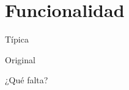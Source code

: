 
\section{Funcionalidad}

	\begin{frame}{Típica}

	\end{frame}

    \begin{frame}{Original}

	\end{frame}

    \begin{frame}{¿Qué falta?}

    \end{frame}
